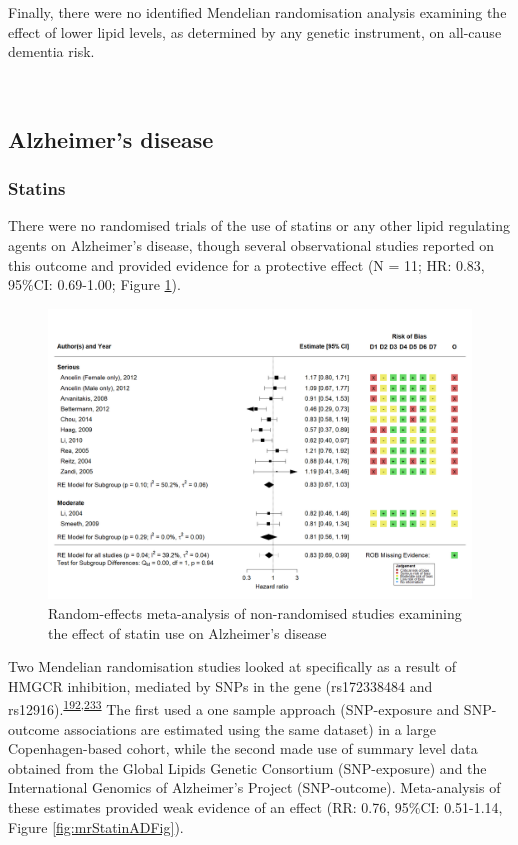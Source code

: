 \documentclass[a4paper, twoside]{templates/ociamthesis}
\begin{document}
Finally, there were no identified Mendelian randomisation analysis examining the effect of lower lipid levels, as determined by any genetic instrument, on all-cause dementia risk.

~

\hypertarget{sys-rev-res-AD}{%
\subsection{Alzheimer's disease}\label{sys-rev-res-AD}}

\hypertarget{statins-1}{%
\subsubsection{Statins}\label{statins-1}}

There were no randomised trials of the use of statins or any other lipid regulating agents on Alzheimer's disease, though several observational studies reported on this outcome and provided evidence for a protective effect (N = 11; HR: 0.83, 95\%CI: 0.69-1.00; Figure \ref{fig:obsStatinADFig}).





\begin{figure}[H]
\includegraphics[width=1\linewidth]{figures/sys-rev/fp_obs_Statin-Ever_AD} \caption[Random-effects meta-analysis of statins on Alzheimer's disease]{Random-effects meta-analysis of non-randomised studies examining the effect of statin use on Alzheimer's disease}\label{fig:obsStatinADFig}
\end{figure}

Two Mendelian randomisation studies looked at specifically as a result of HMGCR inhibition, mediated by SNPs in the gene (rs172338484 and rs12916).\textsuperscript{\protect\hyperlink{ref-benn2017b}{192},\protect\hyperlink{ref-so2017}{233}} The first used a one sample approach (SNP-exposure and SNP-outcome associations are estimated using the same dataset) in a large Copenhagen-based cohort, while the second made use of summary level data obtained from the Global Lipids Genetic Consortium (SNP-exposure) and the International Genomics of Alzheimer's Project (SNP-outcome). Meta-analysis of these estimates provided weak evidence of an effect (RR: 0.76, 95\%CI: 0.51-1.14, Figure \ref{fig:mrStatinADFig}).
\end{document}

